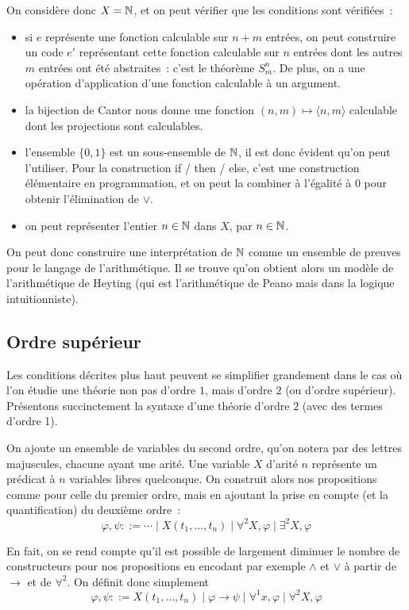 \documentclass{article}
\begin{document}
On considère donc $X = \mathbb{N}$, et on peut vérifier que les conditions sont vérifiées~:
\begin{itemize}
\item si $e$ représente une fonction calculable sur $n + m$ entrées, on peut construire un code $e'$ représentant cette fonction calculable sur $n$ entrées dont les autres $m$ entrées ont été abstraites~: c'est le théorème $S_m^n$. De plus, on a une opération d'application d'une fonction calculable à un argument.
\item la bijection de Cantor nous donne une fonction $(n,m) \mapsto \langle n,m\rangle$ calculable dont les projections sont calculables.
\item l'ensemble $\{0,1\}$ est un sous-ensemble de $\mathbb{N}$, il est donc évident qu'on peut l'utiliser. Pour la construction if / then / else, c'est une construction élémentaire en programmation, et on peut la combiner à l'égalité à $0$ pour obtenir l'élimination de $\lor$.
\item on peut représenter l'entier $n\in \mathbb{N}$ dans $X$, par $n \in \mathbb{N}$.
\end{itemize}

On peut donc construire une interprétation de $\mathbb{N}$ comme un ensemble de preuves pour le langage de l'arithmétique. Il se trouve qu'on obtient alors un modèle de l'arithmétique de Heyting (qui est l'arithmétique de Peano mais dans la logique intuitionniste).

\subsection{Ordre supérieur}

Les conditions décrites plus haut peuvent se simplifier grandement dans le cas où l'on étudie une théorie non pas d'ordre $1$, mais d'ordre $2$ (ou d'ordre supérieur). Présentons succinctement la syntaxe d'une théorie d'ordre $2$ (avec des termes d'ordre 1).

On ajoute un ensemble de variables du second ordre, qu'on notera par des lettres majuscules, chacune ayant une arité. Une variable $X$ d'arité $n$ représente un prédicat à $n$ variables libres quelconque. On construit alors nos propositions comme pour celle du premier ordre, mais en ajoutant la prise en compte (et la quantification) du deuxième ordre~:
\[\varphi,\psi ::= \cdots\mid X(t_1,\ldots,t_n)\mid \forall^2 X, \varphi\mid \exists^2 X, \varphi\]

En fait, on se rend compte qu'il est possible de largement diminuer le nombre de constructeurs pour nos propositions en encodant par exemple $\land$ et $\lor$ à partir de $\to$ et de $\forall^2$. On définit donc simplement
\[\varphi,\psi ::= X(t_1,\ldots,t_n)\mid \varphi\to\psi\mid \forall^1 x, \varphi\mid \forall^2 X, \varphi\]
\end{document}
